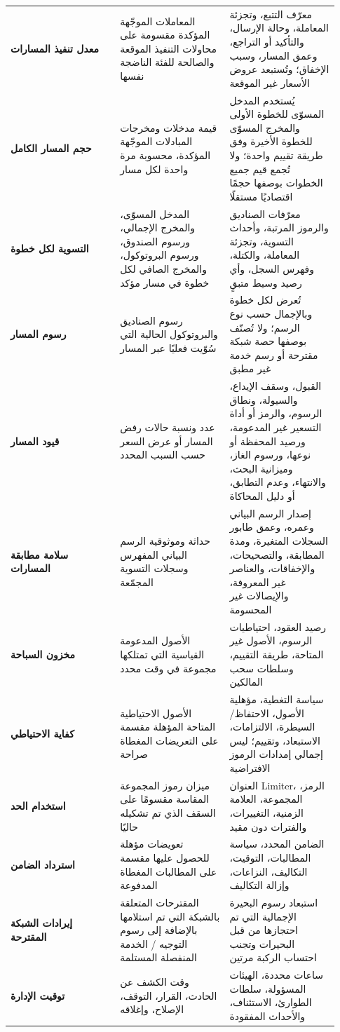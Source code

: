 \documentclass[11pt]{article}
\begin{document}
\begin{longtable}{P{0.31\linewidth} P{0.31\linewidth} P{0.31\linewidth}}
\textbf{معدل تنفيذ المسارات} & المعاملات الموجّهة المؤكدة مقسومة على محاولات التنفيذ الموقعة والصالحة للفئة الناضجة نفسها & معرّف التتبع، وتجزئة المعاملة، وحالة الإرسال، والتأكيد أو التراجع، وعمق المسار، وسبب الإخفاق؛ وتُستبعد عروض الأسعار غير الموقعة \\
\textbf{حجم المسار الكامل} & قيمة مدخلات ومخرجات المبادلات الموجّهة المؤكدة، محسوبة مرة واحدة لكل مسار & يُستخدم المدخل المسوّى للخطوة الأولى والمخرج المسوّى للخطوة الأخيرة وفق طريقة تقييم واحدة؛ ولا تُجمع قيم جميع الخطوات بوصفها حجمًا اقتصاديًا مستقلًا \\
\textbf{التسوية لكل خطوة} & المدخل المسوّى، والمخرج الإجمالي، ورسوم الصندوق، ورسوم البروتوكول، والمخرج الصافي لكل خطوة في مسار مؤكد & معرّفات الصناديق والرموز المرتبة، وأحداث التسوية، وتجزئة المعاملة، والكتلة، وفهرس السجل، وأي رصيد وسيط متبقٍ \\
\textbf{رسوم المسار} & رسوم الصناديق والبروتوكول الحالية التي سُوّيت فعليًا عبر المسار & تُعرض لكل خطوة وبالإجمال حسب نوع الرسم؛ ولا تُصنّف بوصفها حصة شبكة مقترحة أو رسم خدمة غير مطبق \\
\textbf{قيود المسار} & عدد ونسبة حالات رفض المسار أو عرض السعر حسب السبب المحدد & القبول، وسقف الإيداع، والسيولة، ونطاق الرسوم، والرمز أو أداة التسعير غير المدعومة، ورصيد المحفظة أو نوعها، ورسوم الغاز، وميزانية البحث، والانتهاء، وعدم التطابق، أو دليل المحاكاة \\
\textbf{سلامة مطابقة المسارات} & حداثة وموثوقية الرسم البياني المفهرس وسجلات التسوية المجمّعة & إصدار الرسم البياني وعمره، وعمق طابور السجلات المتغيرة، ومدة المطابقة، والتصحيحات، والإخفاقات، والعناصر غير المعروفة، والإيصالات غير المحسومة \\
\textbf{مخزون السباحة} & الأصول المدعومة القياسية التي تمتلكها مجموعة في وقت محدد & رصيد العقود، احتياطيات الرسوم، الأصول غير المتاحة، طريقة التقييم، وسلطات سحب المالكين \\
\textbf{كفاية الاحتياطي} & الأصول الاحتياطية المتاحة المؤهلة مقسمة على التعريضات المغطاة صراحة & سياسة التغطية، مؤهلية الأصول، الاحتفاظ/السيطرة، الالتزامات، الاستبعاد، وتقييم؛ ليس إجمالي إمدادات الرموز الافتراضية \\
\textbf{استخدام الحد} & ميزان رموز المجموعة المقاسة مقسومًا على السقف الذي تم تشكيله حاليًا & العنوان Limiter، الرمز، المجموعة، العلامة الزمنية، التغييرات، والفترات دون مقيد \\
\textbf{استرداد الضامن} & تعويضات مؤهلة للحصول عليها مقسمة على المطالبات المغطاة المدفوعة & الضامن المحدد، سياسة المطالبات، التوقيت، التكاليف، النزاعات، وإزالة التكاليف \\
\textbf{إيرادات الشبكة المقترحة} & المقترحات المتعلقة بالشبكة التي تم استلامها بالإضافة إلى رسوم التوجيه / الخدمة المنفصلة المستلمة & استبعاد رسوم البحيرة الإجمالية التي تم احتجازها من قبل البحيرات وتجنب احتساب الركبة مرتين \\
\textbf{توقيت الإدارة} & وقت الكشف عن الحادث، القرار، التوقف، الإصلاح، وإغلاقه & ساعات محددة، الهيئات المسؤولة، سلطات الطوارئ، الاستئناف، والأحداث المفقودة \\
\bottomrule
\end{longtable}
\end{document}
